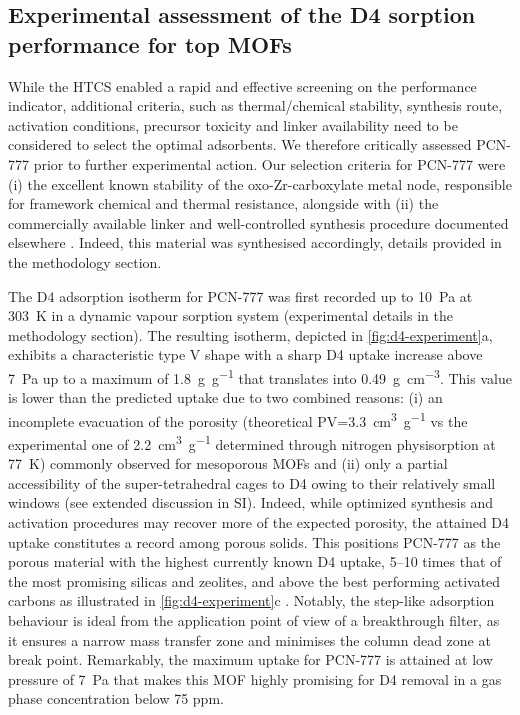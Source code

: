 \subsection{Experimental assessment of the D4 sorption performance for top MOFs}\label{assessment}

While the HTCS enabled a rapid and effective screening on the performance
indicator, additional criteria, such as thermal/chemical stability, synthesis
route, activation conditions, precursor toxicity and linker availability need to
be considered to select the optimal adsorbents. We therefore critically assessed
PCN-777 prior to further experimental action. Our selection criteria for PCN-777
were (i) the excellent known stability of the oxo-Zr-carboxylate metal node,
responsible for framework chemical and thermal resistance, alongside with (ii)
the commercially available linker and well-controlled synthesis procedure
documented elsewhere \citep{fengHighlyStableZeotype2015,
liuPhotocatalyticHydrogenProduction2018}. Indeed, this material was synthesised
accordingly, details provided in the methodology section.

The D4 adsorption isotherm for PCN-777 was first recorded up to \SI{10}{\pascal}
at \SI{303}{\kelvin} in a dynamic vapour sorption system (experimental details
in the methodology section). The resulting isotherm, depicted in
\cref{fig:d4-experiment}a, exhibits a characteristic type V shape
\citep{thommesPhysisorptionGasesSpecial2015} with a sharp D4 uptake increase
above \SI{7}{\pascal} up to a maximum of \SI{1.8}{\gram\per\gram} that
translates into \SI{0.49}{\gram\per\centi\metre\cubed}. This value is lower than
the predicted uptake due to two combined reasons: (i) an incomplete evacuation
of the porosity (theoretical PV=\SI{3.3}{\centi\metre\cubed\per\gram} vs the
experimental one of \SI{2.2}{\centi\metre\cubed\per\gram} determined through
nitrogen physisorption at \SI{77}{\kelvin}) commonly observed for mesoporous
MOFs \citep{nelsonSupercriticalProcessingRoute2009,
parkCrystalStructureGuest2007} and (ii) only a partial accessibility of the
super-tetrahedral cages to D4 owing to their relatively small windows (see
extended discussion in SI). Indeed, while optimized synthesis and activation
procedures may recover more of the expected porosity, the attained D4 uptake
constitutes a record among porous solids. This positions PCN-777 as the porous
material with the highest currently known D4 uptake, 5--10 times that of the
most promising silicas and zeolites, and above the best performing activated
carbons as illustrated in \cref{fig:d4-experiment}c
\citep{wangRecentAdvancesTechnologies2019}. Notably, the step-like adsorption
behaviour is ideal from the application point of view of a breakthrough filter,
as it ensures a narrow mass transfer zone and minimises the column dead zone at
break point. Remarkably, the maximum uptake for PCN-777 is attained at low
pressure of \SI{7}{\pascal} that makes this MOF highly promising for D4 removal
in a gas phase concentration below 75 ppm.

